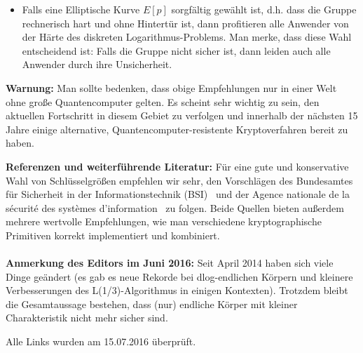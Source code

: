 \begin{refsegment}
\begin{itemize}
\item Falls eine Elliptische Kurve $E[p]$ sorgfältig gewählt ist, d.h. dass die Gruppe rechnerisch hart und ohne Hintertür ist, dann profitieren alle Anwender von der Härte des diskreten Logarithmus-Problems. Man merke, dass diese Wahl entscheidend ist: Falls die Gruppe nicht sicher ist, dann leiden auch alle Anwender durch ihre Unsicherheit.
\end{itemize}

 \textbf{Warnung:} Man sollte bedenken, dass obige Empfehlungen nur in einer Welt ohne große Quantencomputer gelten.
 Es scheint sehr wichtig zu sein, den aktuellen Fortschritt in diesem Gebiet zu verfolgen und innerhalb der nächsten 15 Jahre einige alternative, Quantencomputer-resistente Kryptoverfahren bereit zu haben.

 \textbf{Referenzen und weiterführende Literatur:}
Für eine gute und konservative Wahl von Schlüsselgrößen empfehlen wir sehr, den Vorschlägen des Bundesamtes f\"ur Sicherheit in der Informationstechnik (BSI)~\cite{BSI2012} und der Agence nationale de la s\'ecurit\'e des syst\`emes d'informa\-tion~\cite{refanssi2013} zu folgen. Beide Quellen bieten außerdem mehrere wertvolle Empfehlungen, wie man verschiedene kryptographische Primitiven korrekt implementiert und kombiniert.\\\\

 \textbf{Anmerkung des Editors im Juni 2016:}
Seit April 2014 haben sich viele Dinge geändert (es gab es neue Rekorde bei dlog-endlichen Körpern und kleinere Verbesserungen des L(1/3)-Algorithmus in einigen Kontexten). Trotzdem bleibt die Gesamtaussage bestehen, dass (nur) endliche Körper mit kleiner Charakteristik nicht mehr sicher sind.



\printbibliography[%
	heading=subbibintoc,
	title={Literatur zu Kapitel \thechapter},
	segment=\therefsegment,
]
\end{refsegment}


 Alle Links wurden am 15.07.2016 überprüft.



